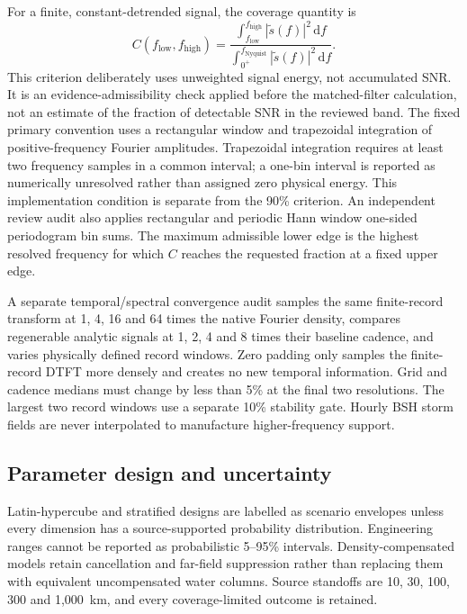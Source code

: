 \documentclass[11pt]{article}
\begin{document}
For a finite, constant-detrended signal, the coverage quantity is
\begin{equation}
 C(f_{\mathrm{low}},f_{\mathrm{high}})=
 \frac{\int_{f_{\mathrm{low}}}^{f_{\mathrm{high}}}|\tilde{s}(f)|^2\,\mathrm{d}f}
 {\int_{0^+}^{f_{\mathrm{Nyquist}}}|\tilde{s}(f)|^2\,\mathrm{d}f}.
\end{equation}
This criterion deliberately uses unweighted signal energy, not accumulated
SNR. It is an evidence-admissibility check applied before the matched-filter
calculation, not an
estimate of the fraction of detectable SNR in the reviewed band. The fixed
primary convention uses a rectangular window and trapezoidal integration of
positive-frequency Fourier amplitudes. Trapezoidal integration requires at
least two frequency samples in a common interval; a one-bin interval is
reported as numerically unresolved rather than assigned zero physical energy.
This implementation condition is separate from the 90\% criterion. An
independent review
audit also applies rectangular and periodic Hann window one-sided periodogram
bin sums. The maximum admissible lower edge is the highest resolved frequency
for which $C$ reaches the requested fraction at a fixed upper edge.

A separate temporal/spectral convergence audit samples the same finite-record
transform at 1, 4, 16 and 64 times the native Fourier density, compares
regenerable analytic signals at 1, 2, 4 and 8 times their baseline cadence, and
varies physically defined record windows. Zero padding only samples the
finite-record DTFT more densely and creates no new temporal information. Grid
and cadence medians must change by less than 5\% at the final two resolutions.
The largest two record windows use a separate 10\% stability gate. Hourly BSH
storm fields are never interpolated to manufacture higher-frequency support.

\subsection{Parameter design and uncertainty}
Latin-hypercube and stratified designs are labelled as scenario envelopes unless
every dimension has a source-supported probability distribution. Engineering
ranges cannot be reported as probabilistic 5--95\% intervals. Density-compensated
models retain cancellation and far-field suppression rather than replacing them
with equivalent uncompensated water columns. Source standoffs are 10, 30, 100,
300 and 1,000~km, and every coverage-limited outcome is retained.
\end{document}
